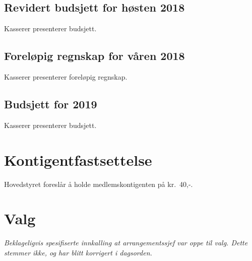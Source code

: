 \documentclass[10pt,norsk,a4paper]{article}
\begin{document}
\subsection{Revidert budsjett for høsten 2018}
Kasserer presenterer budsjett.

\subsection{Foreløpig regnskap for våren 2018}
Kasserer presenterer foreløpig regnskap.

\subsection{Budsjett for 2019}
Kasserer presenterer budsjett.

\section{Kontigentfastsettelse}
Hovedstyret foreslår å holde medlemskontigenten på kr.~40,-.

\newpage
\section{Valg}

\textit{Beklageligvis spesifiserte innkalling at arrangementssjef var oppe til valg. Dette stemmer ikke, og har blitt korrigert i dagsorden.}
\end{document}
